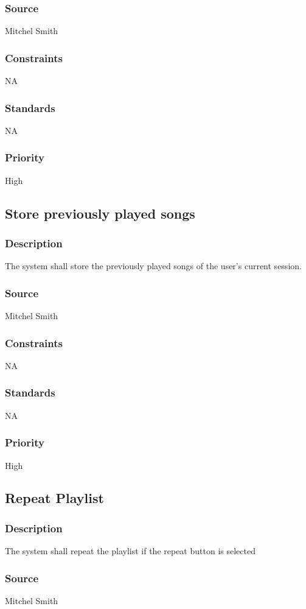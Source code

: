 \subsubsection{Source}
Mitchel Smith
\subsubsection{Constraints}
NA
\subsubsection{Standards}
NA
\subsubsection{Priority}
High




\subsection{Store previously played songs}
\subsubsection{Description}
The system shall store the previously played songs of the user's current session.
\subsubsection{Source}
Mitchel Smith
\subsubsection{Constraints}
NA
\subsubsection{Standards}
NA
\subsubsection{Priority}
High

\subsection{Repeat Playlist}
\subsubsection{Description}
The system shall repeat the playlist if the repeat button is selected 
\subsubsection{Source}
Mitchel Smith
